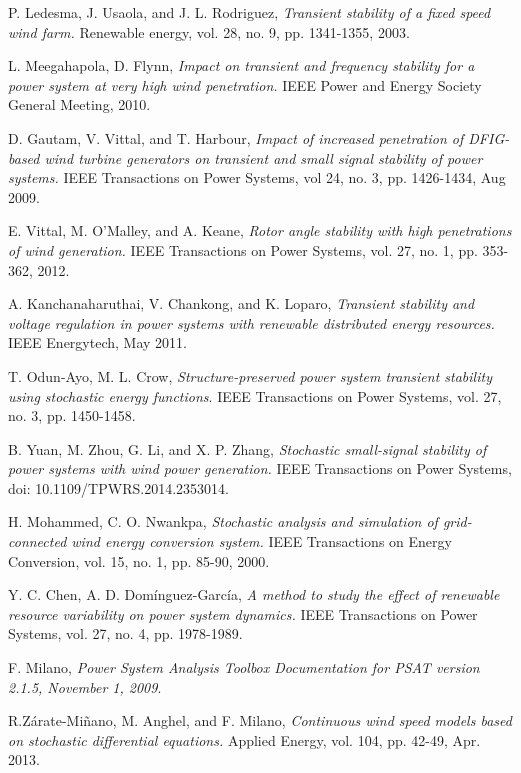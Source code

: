 \documentclass[journal]{IEEEtran}
\begin{document}
\begin{thebibliography}{1}
P. Ledesma, J. Usaola, and J. L. Rodriguez, {\em Transient stability of a fixed speed wind farm.}
\newblock Renewable energy, vol. 28, no. 9, pp. 1341-1355, 2003.

L. Meegahapola, D. Flynn, {\em Impact on transient and frequency stability for a power system at very high wind penetration.}
\newblock  IEEE Power and Energy Society General Meeting, 2010.



D. Gautam, V. Vittal, and T. Harbour, {\em Impact of increased penetration of DFIG-based wind turbine generators on transient and small signal stability of power systems.}
\newblock IEEE Transactions on Power Systems, vol 24, no. 3, pp. 1426-1434, Aug 2009.

E. Vittal, M. O'Malley, and A. Keane, {\em Rotor angle stability with high penetrations of wind generation.}
\newblock IEEE Transactions on Power Systems, vol. 27, no. 1, pp. 353-362, 2012.


A. Kanchanaharuthai, V. Chankong, and K. Loparo, {\em Transient stability and voltage regulation in power systems with renewable distributed energy resources.}
\newblock IEEE Energytech, May 2011.


T. Odun-Ayo, M. L. Crow, {\em Structure-preserved power system transient stability using stochastic energy functions}.
\newblock IEEE Transactions on Power Systems, vol. 27, no. 3, pp. 1450-1458.

B. Yuan, M. Zhou, G. Li, and X. P. Zhang, {\em Stochastic small-signal stability of power systems with wind power generation.}
\newblock IEEE Transactions on Power Systems, doi: 10.1109/TPWRS.2014.2353014.

H. Mohammed, C. O. Nwankpa, {\em Stochastic analysis and simulation of grid-connected wind energy conversion system.}
\newblock IEEE Transactions on Energy Conversion, vol. 15, no. 1, pp. 85-90, 2000.

Y. C. Chen, A. D. Domínguez-García, {\em A method to study the effect of renewable resource variability on power system dynamics.}
\newblock IEEE Transactions on Power Systems, vol. 27, no. 4, pp. 1978-1989.

F. Milano, {\em Power System Analysis Toolbox Documentation for PSAT version 2.1.5, November 1, 2009}.

R.Zárate-Miñano, M. Anghel, and F. Milano, {\em Continuous wind speed models based on stochastic differential equations.}
\newblock Applied Energy, vol. 104, pp. 42-49, Apr. 2013.


\end{thebibliography}
\end{document}
